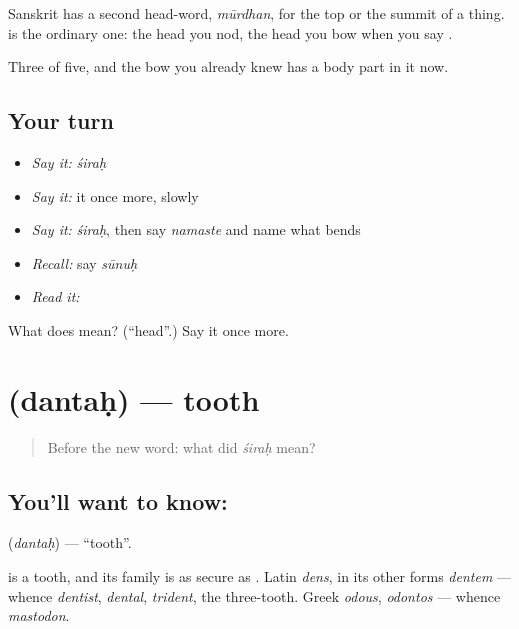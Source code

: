 Sanskrit has a second head-word, \emph{mūrdhan}, for the top or the summit of a thing.  is the ordinary one: the head you nod, the head you bow when you say .

\begin{grammarlens}[title={What you've built}]
Three of five, and the bow you already knew has a body part in it now.
\end{grammarlens}

\subsection*{Your turn}
\begin{itemize}
\raggedright
  \item \emph{Say it:} \emph{śiraḥ}
  \item \emph{Say it:} it once more, slowly
  \item \emph{Say it:} \emph{śiraḥ}, then say \emph{namaste} and name what bends
  \item \emph{Recall:} say \emph{sūnuḥ}
  \item \emph{Read it:} \textbf{}
\end{itemize}

\begin{tcolorbox}[breakable,colback=teal!4,colframe=teal!35!black,title={Before you move on}]
What does  mean? (\textquotedblleft{}head\textquotedblright{}.) Say it once more.
\end{tcolorbox}
\section[\texorpdfstring{\sk{दन्तः} (dantaḥ)}{दन्तः (dantaḥ)}]{ (dantaḥ) — tooth}

\label{lesson:SA-C25-tooth}



\begin{quote}
Before the new word: what did \emph{śiraḥ} mean?
\end{quote}

\subsection*{You'll want to know: }
\textbf{} (\emph{dantaḥ}) — \textquotedblleft{}tooth\textquotedblright{}.

\textbf{} is a tooth, and its family is as secure as . Latin \emph{dens}, in its other forms \emph{dentem} — whence \emph{dentist}, \emph{dental}, \emph{trident}, the three-tooth. Greek \emph{odous}, \emph{odontos} — whence \emph{mastodon}.

